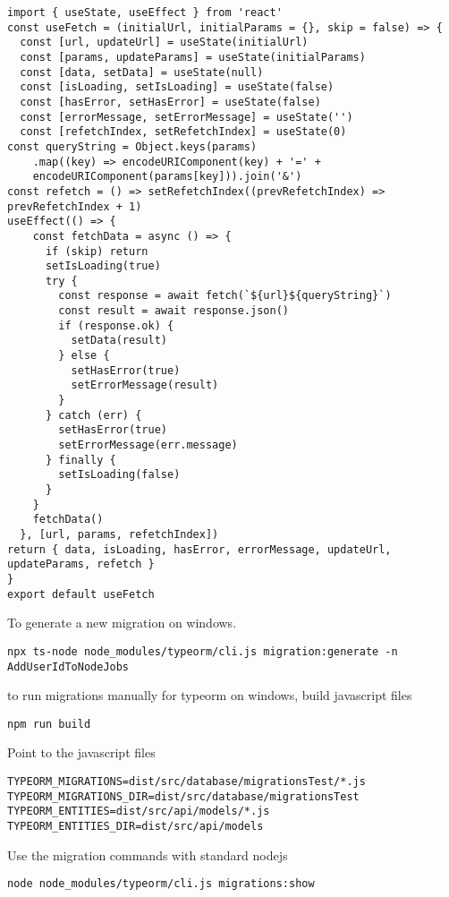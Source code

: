 

\begin{lstlisting}
import { useState, useEffect } from 'react'
const useFetch = (initialUrl, initialParams = {}, skip = false) => {
  const [url, updateUrl] = useState(initialUrl)
  const [params, updateParams] = useState(initialParams)
  const [data, setData] = useState(null)
  const [isLoading, setIsLoading] = useState(false)
  const [hasError, setHasError] = useState(false)
  const [errorMessage, setErrorMessage] = useState('')
  const [refetchIndex, setRefetchIndex] = useState(0)
const queryString = Object.keys(params)
    .map((key) => encodeURIComponent(key) + '=' +
    encodeURIComponent(params[key])).join('&')
const refetch = () => setRefetchIndex((prevRefetchIndex) => prevRefetchIndex + 1)
useEffect(() => {
    const fetchData = async () => {
      if (skip) return
      setIsLoading(true)
      try {
        const response = await fetch(`${url}${queryString}`)
        const result = await response.json()
        if (response.ok) {
          setData(result)
        } else {
          setHasError(true)
          setErrorMessage(result)
        }
      } catch (err) {
        setHasError(true)
        setErrorMessage(err.message)
      } finally {
        setIsLoading(false)
      }
    }
    fetchData()
  }, [url, params, refetchIndex])
return { data, isLoading, hasError, errorMessage, updateUrl, updateParams, refetch }
}
export default useFetch
\end{lstlisting}

To generate a new migration on windows.

\begin{lstlisting}
npx ts-node node_modules/typeorm/cli.js migration:generate -n AddUserIdToNodeJobs
\end{lstlisting}

to run migrations manually for typeorm on windows, build javascript files

\begin{lstlisting}
npm run build
\end{lstlisting}

Point to the javascript files
\begin{lstlisting}
TYPEORM_MIGRATIONS=dist/src/database/migrationsTest/*.js
TYPEORM_MIGRATIONS_DIR=dist/src/database/migrationsTest
TYPEORM_ENTITIES=dist/src/api/models/*.js
TYPEORM_ENTITIES_DIR=dist/src/api/models
\end{lstlisting}

Use the migration commands with standard nodejs
\begin{lstlisting}
node node_modules/typeorm/cli.js migrations:show
\end{lstlisting}

